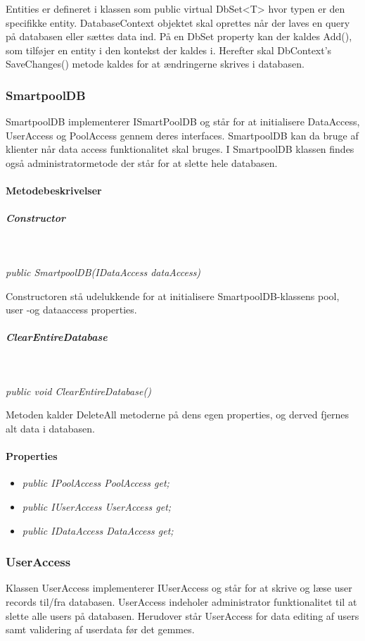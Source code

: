 Entities er defineret i klassen som public virtual DbSet<T> hvor typen er den specifikke entity.
DatabaseContext objektet skal oprettes når der laves en query på databasen eller sættes data ind.
På en DbSet property kan der kaldes Add(), som tilføjer en entity i den kontekst der kaldes i. Herefter skal DbContext’s SaveChanges() metode kaldes for at ændringerne skrives i databasen.

\subsubsection{SmartpoolDB}
SmartpoolDB implementerer ISmartPoolDB og står for at initialisere DataAccess, UserAccess og PoolAccess gennem deres interfaces. SmartpoolDB kan da bruge af klienter når data access funktionalitet skal bruges. I SmartpoolDB klassen findes også administratormetode der står for at slette hele databasen.


\paragraph{Metodebeskrivelser}

\subparagraph{Constructor}\

\textit{public SmartpoolDB(IDataAccess dataAccess)}

Constructoren stå udelukkende for at initialisere SmartpoolDB-klassens pool, user -og dataaccess properties.

\subparagraph{ClearEntireDatabase}\

\textit{public void ClearEntireDatabase()}

Metoden kalder DeleteAll metoderne på dens egen properties, og derved fjernes alt data i databasen.

\paragraph{Properties}

\begin{itemize}
	\item \textit{public IPoolAccess PoolAccess { get; }}
	\item \textit{public IUserAccess UserAccess { get; }}
	\item \textit{public IDataAccess DataAccess { get; }}
\end{itemize}

\subsubsection{UserAccess}
Klassen UserAccess implementerer IUserAccess og står for at skrive og læse user records til/fra databasen.
UserAccess indeholer administrator funktionalitet til at slette alle users på databasen. Herudover står UserAccess for data editing af users samt validering af userdata før det gemmes. 

